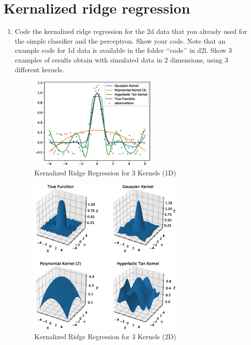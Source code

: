\documentclass{article}[12pt]
\begin{document}
\section{Kernalized ridge regression}
\begin{enumerate}
\item Code the kernalized ridge regression for the 2d data that you already used for the simple classifier and the perceptron. Show your code. Note that an example code for 1d data is available in the folder \lq\lq{}code\rq\rq{} in d2l.   Show 3 examples of results obtain with simulated data in 2 dimensions, using 3 different kernels. 

\begin{figure}[H]
\centering
\includegraphics[width=0.6\textwidth]{./img/krr_k.eps}
\caption{Kernalized Ridge Regression  for 3 Kernels (1D)}
\end{figure}

\begin{figure}[H]
\centering
\includegraphics[width=0.73\textwidth]{./img/krr_k2.eps}
\caption{Kernalized Ridge Regression for 3 Kernels (2D)}
\end{figure}


\end{enumerate}
\end{document}
